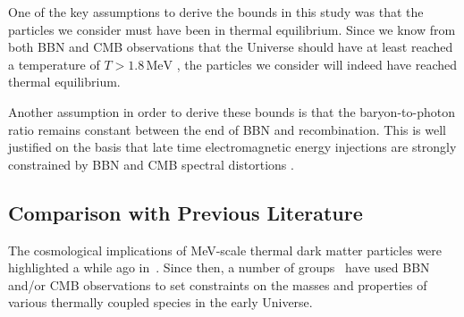 One of the key assumptions to derive the bounds in this study was that the particles we consider must have been in thermal equilibrium. Since we know from both BBN and CMB observations that the Universe should have at least reached a temperature of $T > 1.8\,\text{MeV}$ \cite{deSalas:2015glj,Hasegawa:2019jsa}, the particles we consider will indeed have reached thermal equilibrium. 

Another assumption in order to derive these bounds is that the baryon-to-photon ratio remains constant between the end of BBN and recombination. This is well justified on the basis that late time electromagnetic energy injections are strongly constrained by BBN \cite{Kawasaki:2017bqm,Hufnagel:2018bjp,Forestell:2018txr} and CMB spectral distortions \cite{Hu:1992dc,Hu:1993gc}.

\subsection{Comparison with Previous Literature} 

The cosmological implications of MeV-scale thermal dark matter particles were highlighted a while ago in~\cite{Kolb:1986nf}. Since then, a number of groups~\cite{Kolb:1986nf,Serpico:2004nm,Boehm:2013jpa,Nollett:2013pwa,Nollett:2014lwa,Boehm:2012gr,Ho:2012ug,Wilkinson:2016gsy,Depta:2019lbe,Escudero:2018mvt} have used BBN and/or CMB observations to set constraints on the masses and properties of various thermally coupled species in the early Universe. 

